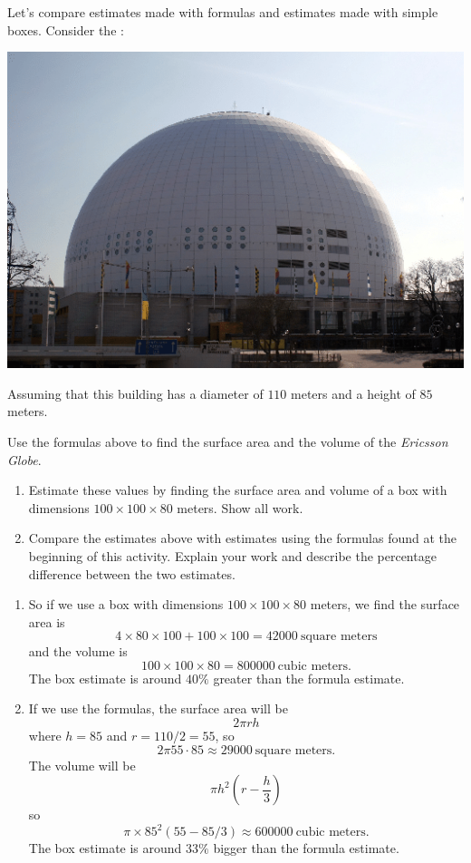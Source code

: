 \documentclass[handout,nooutcomes,noauthor,hints1,12pt]{ximera}
\begin{document}
\begin{question} \label{FG1:1}
  Let's compare estimates made with formulas and estimates made with
  simple boxes. Consider the :
   \begin{center}
    \includegraphics[width=.4\textwidth]{dome.png} %
   \end{center}
   Assuming that this building has a diameter of $110$ meters and a
   height of $85$ meters.
   
   Use the formulas above to find the surface area
   and the volume of the \textit{Ericsson Globe}.
\begin{enumerate}
\item Estimate these values by finding the surface area and volume of
  a box with dimensions $100\times 100 \times 80$ meters. Show all work.
\item Compare the estimates above with estimates using the formulas
  found at the beginning of this activity. Explain your work and
  describe the percentage difference between the two estimates.
\end{enumerate}
\begin{freeResponse}
  \begin{enumerate}
  \item So if we use a box with dimensions $100\times 100 \times 80$ meters,
    we find the surface area is
    \[
    4\times 80 \times 100 +100\times 100= 42000~\text{square meters}
    \]
    and the volume is
    \[
    100\times 100 \times 80 = 800000~\text{cubic meters.}
    \]
    The box estimate is around $40\%$ greater than the formula
    estimate.
  \item If we use the formulas, the surface area will be
    \[
    2\pi rh
    \]
    where $h=85$ and $r= 110/2 = 55$, so
    \[
    2\pi 55\cdot 85 \approx  29000~\text{square meters}.
    \]
    The volume will be
    \[
    \pi h^2 \left( r- \frac{h}{3}\right)
    \]
    so
    \[
    \pi \times 85^2 (55 - 85/3) \approx 600000 ~\text{cubic meters.}
    \]
    The box estimate is around $33\%$ bigger than the formula
    estimate.
  \end{enumerate}
\end{freeResponse}
   \end{question}
\mynewpage
\end{document}
